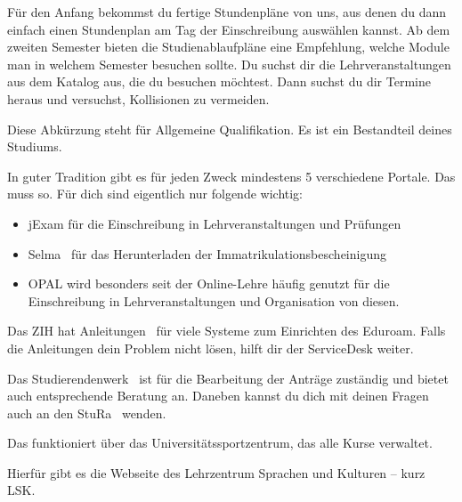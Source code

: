 Für den Anfang bekommst du fertige Stundenpläne von uns, aus denen du dann einfach einen Stundenplan am Tag der Einschreibung auswählen kannst. Ab dem zweiten Semester bieten die Studienablaufpläne eine Empfehlung, welche Module man in welchem Semester besuchen sollte. Du suchst dir die Lehrveranstaltungen aus dem Katalog aus, die du besuchen möchtest. Dann suchst du dir Termine heraus und versuchst, Kollisionen zu vermeiden.

Diese Abkürzung steht für Allgemeine Qualifikation. Es ist ein Bestandteil deines Studiums.~

In guter Tradition gibt es für jeden Zweck mindestens 5 verschiedene Portale. Das muss so. Für dich sind eigentlich nur folgende wichtig:
\begin{itemize}
\item jExam für die Einschreibung in Lehrveranstaltungen und Prüfungen
\item Selma~ für das Herunterladen der Immatrikulationsbescheinigung
\item OPAL wird besonders seit der Online-Lehre häufig genutzt für die Einschreibung in Lehrveranstaltungen und Organisation von diesen. 
\end{itemize}

Das ZIH hat Anleitungen~ für viele Systeme zum Einrichten des Eduroam. Falls die Anleitungen dein Problem nicht lösen, hilft dir der ServiceDesk weiter.

Das Studierendenwerk~ ist für die Bearbeitung der Anträge zuständig und bietet auch entsprechende Beratung an. Daneben kannst du dich mit deinen Fragen auch an den StuRa~ wenden.

Das funktioniert über das Universitätssportzentrum, das alle Kurse verwaltet.~ 

Hierfür gibt es die Webseite des Lehrzentrum Sprachen und Kulturen -- kurz LSK.~

